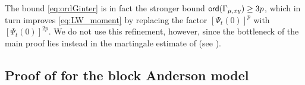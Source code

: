\begin{remark}
The bound \eqref{eq:ordGinter} is in fact the stronger bound ${\mathsf{ord}}(\Gamma_{\mu,xy}) \ge 3p$, which in turn improves \eqref{eq:LW_moment} by replacing the factor $[\Psi_t(0)]^p$ with $[\Psi_t(0)]^{2p}$. We do not use this refinement, however, since the bottleneck of the main proof lies instead in the martingale estimate of  (see ).
\end{remark}



\subsection{Proof of \texorpdfstring{}{LemGraph1} for the block Anderson model}\label{subsec:LWchange-to-BA}

